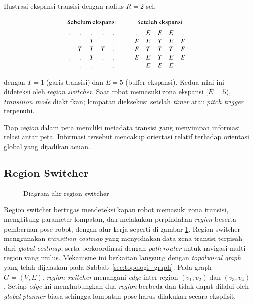 Ilustrasi ekspansi transisi dengan radius $R = 2$ sel:

\begin{equation}
\begin{array}{c@{\qquad}c}
\text{Sebelum ekspansi} & \text{Setelah ekspansi} \\[4pt]
\begin{array}{ccccc}
. & . & . & . & . \\
. & . & T & . & . \\
. & T & T & T & . \\
. & . & T & . & . \\
. & . & . & . & .
\end{array}
&
\begin{array}{ccccc}
. & E & E & E & . \\
E & E & T & E & E \\
E & T & T & T & E \\
E & E & T & E & E \\
. & E & E & E & .
\end{array}
\end{array}
\end{equation}

dengan $T = 1$ (garis transisi) dan $E = 5$ (buffer ekspansi). Kedua
nilai ini dideteksi oleh 
\emph{region switcher}. Saat robot memasuki zona ekspansi ($E = 5$), \emph{transition mode} diaktifkan; lompatan dieksekusi setelah
\emph{timer} atau \emph{pitch trigger} terpenuhi.

Tiap \emph{region} dalam peta memiliki metadata transisi yang menyimpan
informasi relasi antar peta. Informasi tersebut mencakup orientasi
relatif terhadap orientasi global yang dijadikan acuan.

\subsection{Region Switcher}

\begin{figure}[H]
\centering

\caption{Diagram alir region switcher}
\label{fig:region_switcher_flow}
\end{figure}

Region switcher bertugas mendeteksi kapan robot memasuki zona transisi,
menghitung parameter lompatan, dan melakukan perpindahan \emph{region}
beserta pembaruan pose robot, dengan alur kerja seperti di gambar \ref{fig:region_switcher_flow}. Region switcher menggunakan
\emph{transition costmap} yang menyediakan data zona transisi
terpisah dari \emph{global costmap}, serta berkoordinasi dengan
\emph{path router} untuk navigasi multi-region yang mulus. Mekanisme ini berkaitan langsung dengan
\emph{topological graph} yang telah dijelaskan pada
Subbab~\ref{sec:topologi_graph}. Pada graph $G = (V, E)$,
\emph{region switcher} menangani \emph{edge} inter-region
$(v_1, v_2)$  dan $(v_3, v_4)$.
Setiap \emph{edge} ini menghubungkan dua \emph{region} berbeda dan
tidak dapat dilalui oleh \emph{global planner} biasa sehingga lompatan
pose harus dilakukan secara eksplisit.

